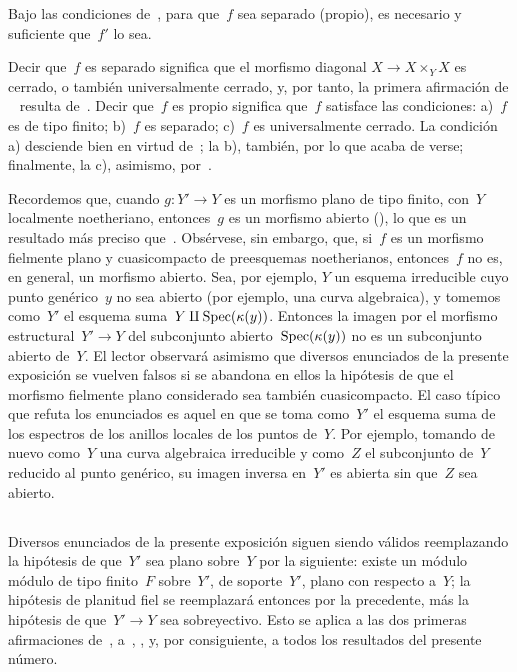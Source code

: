 \begin{corollaire}
\label{VIII.4.8}
Bajo las condiciones de~, para que~$f$ sea separado
(\resp propio), es necesario y suficiente que~$f'$ lo sea.
\end{corollaire}

Decir que~$f$ es separado significa que el morfismo diagonal
$X\to X\times_{Y}X$ es cerrado, o también universalmente cerrado, y, por
tanto, la primera afirmación
{}
{de}
~ resulta de~. Decir que~$f$ es propio
significa que~$f$ satisface las condiciones: a)~$f$ es de tipo finito;
b)~$f$ es separado; c)~$f$ es universalmente cerrado. La condición a)
desciende bien en virtud de~; la b), también, por lo que
acaba de verse; finalmente, la c), asimismo, por~.

\begin{remarques}
\label{VIII.4.9}
Recordemos que, cuando $g\colon Y'\to Y$ es un morfismo plano de tipo
finito, con~$Y$ localmente noetheriano, entonces~$g$ es un morfismo
abierto
(),
lo que es un resultado más preciso que~. Obsérvese, sin
embargo, que, si~$f$ es un morfismo fielmente plano y cuasicompacto de
preesquemas noetherianos, entonces~$f$ no es, en general, un morfismo
abierto. Sea, por ejemplo, $Y$ un esquema irreducible cuyo punto
genérico~$y$ no sea abierto (por ejemplo, una curva algebraica), y tomemos
como~$Y'$ el esquema suma~$Y\amalg\operatorname{Spec}(\kappa(y))$. Entonces la imagen por
el morfismo estructural~$Y'\to Y$ del subconjunto
abierto~$\operatorname{Spec}(\kappa(y))$ no es un subconjunto abierto de~$Y$. El lector
observará asimismo que diversos enunciados de la presente exposición se
vuelven falsos si se abandona en ellos la hipótesis de que el morfismo
fielmente plano considerado sea también cuasicompacto. El caso típico que
refuta los enunciados es aquel en que se toma como~$Y'$ el esquema suma de
los espectros de los anillos locales de los puntos de~$Y$. Por ejemplo,
tomando de nuevo como~$Y$ una curva algebraica irreducible y como~$Z$ el
subconjunto de~$Y$ reducido al punto genérico, su imagen inversa en~$Y'$ es
abierta sin que~$Z$ sea abierto.
\end{remarques}

\setcounter{subsection}{9}
\subsection{}
\label{VIII.4.10}
Diversos
enunciados de la presente exposición siguen siendo válidos reemplazando la
hipótesis de que~$Y'$ sea plano sobre~$Y$ por la siguiente: existe un
{módulo}
{módulo}
de tipo finito~$F$ sobre~$Y'$, de soporte~$Y'$, plano con respecto a~$Y$;
la hipótesis de planitud fiel se reemplazará entonces por la precedente,
más la hipótesis de que~$Y'\to Y$ sea sobreyectivo. Esto se aplica a las
dos primeras afirmaciones de~, a~,
,  y, por consiguiente, a todos los resultados
del presente número.
